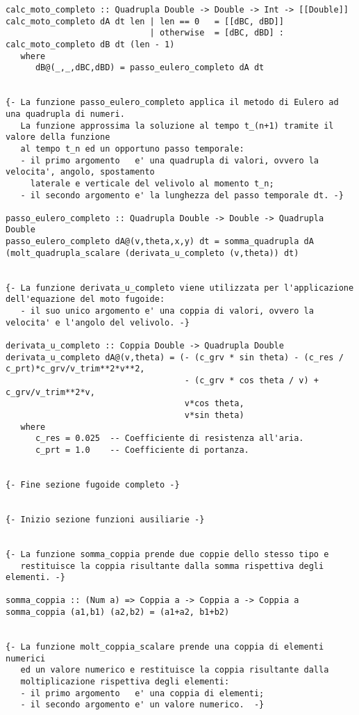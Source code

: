 \begin{verbatim}
calc_moto_completo :: Quadrupla Double -> Double -> Int -> [[Double]]
calc_moto_completo dA dt len | len == 0   = [[dBC, dBD]]
                             | otherwise  = [dBC, dBD] : calc_moto_completo dB dt (len - 1)
   where
      dB@(_,_,dBC,dBD) = passo_eulero_completo dA dt


{- La funzione passo_eulero_completo applica il metodo di Eulero ad una quadrupla di numeri. 
   La funzione approssima la soluzione al tempo t_(n+1) tramite il valore della funzione 
   al tempo t_n ed un opportuno passo temporale:
   - il primo argomento   e' una quadrupla di valori, ovvero la velocita', angolo, spostamento 
     laterale e verticale del velivolo al momento t_n;
   - il secondo argomento e' la lunghezza del passo temporale dt. -}

passo_eulero_completo :: Quadrupla Double -> Double -> Quadrupla Double
passo_eulero_completo dA@(v,theta,x,y) dt = somma_quadrupla dA (molt_quadrupla_scalare (derivata_u_completo (v,theta)) dt)


{- La funzione derivata_u_completo viene utilizzata per l'applicazione dell'equazione del moto fugoide:
   - il suo unico argomento e' una coppia di valori, ovvero la velocita' e l'angolo del velivolo. -}

derivata_u_completo :: Coppia Double -> Quadrupla Double
derivata_u_completo dA@(v,theta) = (- (c_grv * sin theta) - (c_res / c_prt)*c_grv/v_trim**2*v**2,
                                    - (c_grv * cos theta / v) + c_grv/v_trim**2*v,
                                    v*cos theta,
                                    v*sin theta)
   where
      c_res = 0.025  -- Coefficiente di resistenza all'aria.
      c_prt = 1.0    -- Coefficiente di portanza.


{- Fine sezione fugoide completo -}


{- Inizio sezione funzioni ausiliarie -}


{- La funzione somma_coppia prende due coppie dello stesso tipo e 
   restituisce la coppia risultante dalla somma rispettiva degli elementi. -}

somma_coppia :: (Num a) => Coppia a -> Coppia a -> Coppia a
somma_coppia (a1,b1) (a2,b2) = (a1+a2, b1+b2)


{- La funzione molt_coppia_scalare prende una coppia di elementi numerici
   ed un valore numerico e restituisce la coppia risultante dalla 
   moltiplicazione rispettiva degli elementi:
   - il primo argomento   e' una coppia di elementi;
   - il secondo argomento e' un valore numerico.  -}


\end{verbatim}

